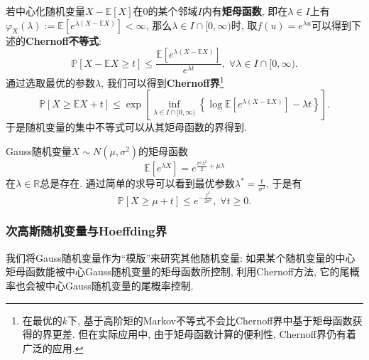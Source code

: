 若中心化随机变量$X - \mathbb{E}[X]$在$0$的某个邻域$I$内有\textbf{矩母函数}, 即在$\lambda \in I$上有$\varphi_X(\lambda) := \mathbb{E}[e^{\lambda (X - \mathbb{E}X)}] < \infty$, 那么$\lambda \in I \cap [0, \infty)$时, 取$f(u) = e^{\lambda u}$可以得到下述的\textbf{Chernoff不等式}: 
\begin{equation*}
	\mathbb{P}[X - \mathbb{E}X \geq t] 
	\leq \frac{\mathbb{E}[e^{\lambda(X - \mathbb{E}X)}]}{e^{\lambda t}},\;
	\forall \lambda \in I \cap [0, \infty).
\end{equation*}
通过选取最优的参数$\lambda$, 我们可以得到\textbf{Chernoff界}\footnote{在最优的$k$下, 基于高阶矩的Markov不等式不会比Chernoff界中基于矩母函数获得的界更差. 但在实际应用中, 由于矩母函数计算的便利性, Chernoff界仍有着广泛的应用.}
\begin{equation*}
	\mathbb{P}[X \geq \mathbb{E}X + t]
	\leq \exp \left[ \inf_{\lambda \in I \cap [0, \infty)} \left\{ \log \mathbb{E}[e^{\lambda(X - \mathbb{E}X)}] - \lambda t \right\} \right]. 
\end{equation*}
于是随机变量的集中不等式可以从其矩母函数的界得到. 

\begin{example}[Gauss随机变量的上偏差不等式]
	Gauss随机变量$X \sim N(\mu, \sigma^2)$的矩母函数
	\begin{equation}
		\mathbb{E}[e^{\lambda X}] = e^{\frac{\sigma^2 \lambda^2}{2} + \mu \lambda} 		
	\end{equation}
	在$\lambda \in \mathbb{R}$总是存在. 
	通过简单的求导可以看到最优参数$\lambda^* = \frac{t}{\sigma^2}$, 于是有
	\begin{equation}\label{eq:UpperDeviationOfSubGuassianRV}
		\mathbb{P}[X \geq \mu + t] \leq e^{- \frac{t^2}{2 \sigma^2}},\; \forall t \geq 0. 
	\end{equation}
\end{example}

\subsubsection{次高斯随机变量与Hoeffding界}

我们将Gauss随机变量作为“模版”来研究其他随机变量: 如果某个随机变量的中心矩母函数能被中心Gauss随机变量的矩母函数所控制, 利用Chernoff方法, 它的尾概率也会被中心Gauss随机变量的尾概率控制. 

